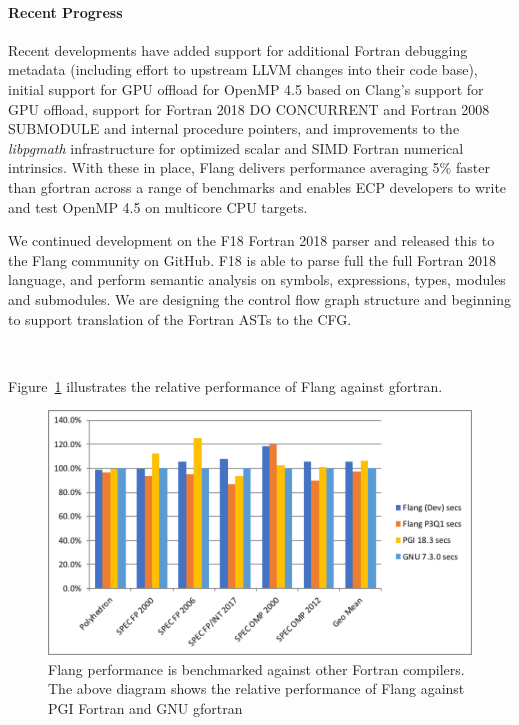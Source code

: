 \paragraph{Recent Progress}
Recent developments have added support for additional Fortran debugging metadata
(including effort to upstream LLVM changes into their code base),
initial support for GPU offload for OpenMP 4.5 \cite{openmp-spec-45} based on
Clang's support for GPU offload,
support for Fortran 2018 DO CONCURRENT and
Fortran 2008 SUBMODULE and internal procedure pointers,
and improvements to the \emph{libpgmath} infrastructure for optimized
scalar and SIMD Fortran numerical intrinsics. With these in place, Flang delivers
performance averaging 5\% faster than gfortran across a range of benchmarks and
enables ECP developers to write and test OpenMP 4.5 on multicore CPU targets.

We continued development on the F18 Fortran 2018 parser and released this to the
Flang community on GitHub.
F18 is able to parse full the full Fortran 2018 language,
and perform semantic analysis on symbols, expressions,
types, modules and submodules.
We are designing the control flow graph structure and beginning
to support translation of the Fortran ASTs to the CFG.

\

Figure~\ref{fig:flang-performance} illustrates the relative performance of Flang against gfortran.

\begin{figure}[htb]
	\centering
	\includegraphics[width=6in]{projects/2.3.2-Tools/2.3.2.12-Flang/flang-performance}
	\caption{\label{fig:flang-performance}Flang performance is benchmarked against other Fortran compilers. The above diagram shows the relative performance of Flang against PGI Fortran and GNU gfortran}
\end{figure}


